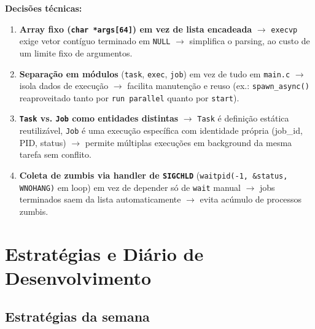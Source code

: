 \documentclass[11pt,a4paper]{article}
\begin{document}
\textbf{Decisões técnicas:}
\begin{enumerate}[itemsep=2pt]
  \item \textbf{Array fixo (\texttt{char *args[64]}) em vez de lista encadeada} $\to$ \texttt{execvp} exige vetor contíguo terminado em \texttt{NULL} $\to$ simplifica o parsing, ao custo de um limite fixo de argumentos.
  \item \textbf{Separação em módulos} (\texttt{task}, \texttt{exec}, \texttt{job}) em vez de tudo em \texttt{main.c} $\to$ isola dados de execução $\to$ facilita manutenção e reuso (ex.: \texttt{spawn\_async()} reaproveitado tanto por \texttt{run parallel} quanto por \texttt{start}).
  \item \textbf{\texttt{Task} vs. \texttt{Job} como entidades distintas} $\to$ \texttt{Task} é definição estática reutilizável, \texttt{Job} é uma execução específica com identidade própria (job\_id, PID, status) $\to$ permite múltiplas execuções em background da mesma tarefa sem conflito.
  \item \textbf{Coleta de zumbis via handler de \texttt{SIGCHLD}} (\texttt{waitpid(-1, \&status, WNOHANG)} em loop) em vez de depender só de \texttt{wait} manual $\to$ jobs terminados saem da lista automaticamente $\to$ evita acúmulo de processos zumbis.
\end{enumerate}

\section{Estratégias e Diário de Desenvolvimento}

\subsection{Estratégias da semana}
\end{document}
